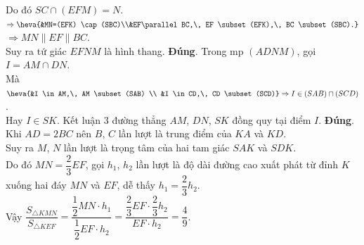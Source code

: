 \begin{ex}
{\begin{itemchoice}
   Do đó $SC \cap(EFM)=N$. \\
   $\Rightarrow \heva{&MN=(EFK) \cap(SBC)\\&EF\parallel BC,\, EF \subset(EFK),\, BC \subset(SBC).}$\\
  $\Rightarrow MN \parallel EF  \parallel BC$.\\
  Suy ra tứ  giác $EFNM$ là hình thang.
  \itemch \textbf{Đúng}. Trong  mp $(ADNM)$, gọi $I=AM \cap DN$.\\
  Mà $\heva{&I \in AM,\, AM \subset(SAB) \\ &I \in CD,\, CD \subset(SCD)} \Rightarrow I  \in(SAB) \cap(SCD)$.\\
   Hay $I \in SK$. Kết luận $3$ đường thẳng $AM$, $DN$, $SK$ đồng quy tại điểm $I$.
  \itemch \textbf{Đúng}. Khi $AD=2BC$ nên $B$, $C$ lần lượt là trung điểm của $KA$ và $KD$.\\  Suy ra $M$, $N$ lần lượt là trọng tâm của hai tam giác $SAK$ và $SDK$.\\
  Do đó $MN=\dfrac{2}{3} EF$, gọi $h_1$, $h_2$ lần lượt là độ dài đường cao xuất phát từ đỉnh $K$ xuống hai đáy $MN$ và  $EF$, dễ thấy $h_1=\dfrac{2}{3}h_2$.\\
   Vậy $\dfrac{S_{\triangle KMN}}{S_{\triangle KEF}}=\dfrac{\dfrac{1}{2} MN \cdot h_1}{\dfrac{1}{2} EF \cdot h_2}=\dfrac{\dfrac{2}{3} EF \cdot \dfrac{2}{3}h_2}{EF \cdot h_2}=\dfrac{4}{9}$.
\end{itemchoice} }
\end{ex}

